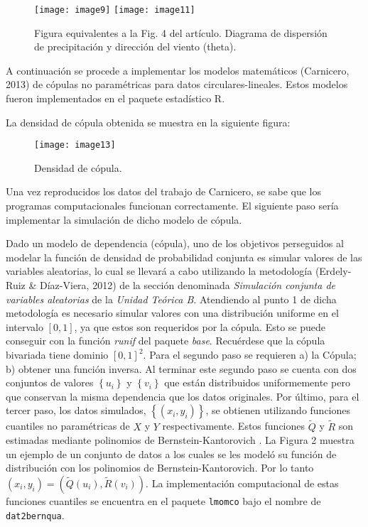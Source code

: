 \begin{figure}
	\centering
\texttt{[image: image9]} 
\texttt{[image: image11]}
	\caption{Figura equivalentes a la Fig. 4 del art\'iculo. Diagrama de dispersi\'on de precipitaci\'on y direcci\'on del viento (theta).}
	\label{f:gijonDens2D}
\end{figure}

A continuaci\'on se procede a implementar los modelos matem\'aticos (Carnicero, 2013) de c\'opulas no param\'etricas para datos circulares-lineales. Estos modelos fueron implementados en el paquete estad\'istico R.

La densidad de c\'opula obtenida se muestra en la siguiente figura:

\begin{figure}
	\centering
\texttt{[image: image13]}
	\caption{Densidad de c\'opula.}
	\label{f:gijonDens2Dpixels}
\end{figure}

Una vez reproducidos los datos del trabajo de Carnicero, se sabe que los programas computacionales funcionan correctamente. El siguiente paso ser\'ia implementar la simulaci\'on de dicho modelo de c\'opula.

Dado un modelo de dependencia (c\'opula), uno de los objetivos perseguidos al modelar la funci\'on de densidad de probabilidad conjunta es simular valores de las variables aleatorias, lo cual se llevar\'a a cabo utilizando la metodolog\'ia (Erdely-Ruiz \& D\'iaz-Viera, 2012) de la secci\'on denominada \emph{Simulaci\'on conjunta de variables aleatorias} de la \emph{Unidad Te\'orica B}. Atendiendo al punto 1 de dicha metodolog\'ia es necesario simular valores con una distribuci\'on uniforme en el intervalo \(\left\lbrack 0,1 \right\rbrack\), ya que estos son requeridos por la c\'opula. Esto se puede conseguir con la funci\'on \emph{runif} del paquete \emph{base}. Recu\'erdese que la c\'opula bivariada tiene dominio \(\left\lbrack 0,1 \right\rbrack^{2}\). Para el segundo paso se requieren a) la C\'opula; b) obtener una funci\'on inversa. Al terminar este segundo paso se cuenta con dos conjuntos de valores \(\left\{ u_{i} \right\}\) y \(\left\{ v_{i} \right\}\) que est\'an distribuidos uniformemente pero que conservan la misma dependencia que los datos originales. Por \'ultimo, para el tercer paso, los datos simulados, \(\left\{ \left( x_{i},y_{i} \right) \right\}\), se obtienen utilizando funciones cuantiles no param\'etricas de \(X\) y \(Y\) respectivamente. Estos funciones \(\tilde{Q}\) y \(\tilde{R}\) son estimadas mediante polinomios de Bernstein-Kantorovich \citep{munoz-perez_estimating_1987}. La Figura 2 muestra un ejemplo de un conjunto de datos a los cuales se les model\'o su funci\'on de distribuci\'on con los polinomios de Bernstein-Kantorovich. Por lo tanto \(\left( x_{i},y_{i} \right) = \left( \tilde{Q}\left( u_{i} \right),\tilde{R}\left( v_{i} \right) \right)\).
La implementaci\'on computacional de estas funciones cuantiles se encuentra en el paquete \verb|lmomco| bajo el nombre de \verb|dat2bernqua|.

